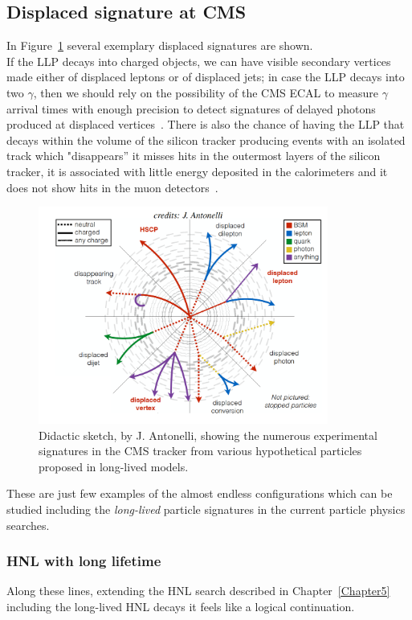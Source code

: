 \subsection{Displaced signature at CMS}
In Figure~\ref{fig:c6antonelli} several exemplary displaced
signatures are shown.\\
If the LLP decays into charged objects, we can have visible secondary vertices
made either of displaced leptons or of displaced jets; in case the LLP decays into two $\gamma$,
then we should rely on the possibility of the CMS
ECAL to measure $\gamma$ arrival times with enough precision to detect
signatures of delayed photons produced at displaced
vertices~\cite{Sirunyan:2019wau}.
There is also the chance of having the LLP that decays within the
volume of the silicon tracker producing events with an isolated track
which "disappears'' \ie it misses hits in the outermost layers of the
silicon tracker, it is associated with little energy deposited in the
calorimeters and it does not show hits in the muon detectors~\cite{Sirunyan_2020disapp}. 
\begin{figure}[h]
\centering
\includegraphics[clip,trim=0cm 0.cm 0.cm 1.6cm, width=0.85\textwidth]{Figures/c6/antonelli_skech.pdf}
\caption{Didactic sketch, by J. Antonelli, showing the numerous
  experimental signatures in the CMS tracker from various hypothetical particles proposed in long-lived models. }
\label{fig:c6antonelli}
\end{figure}

These are just few examples of the almost endless configurations which can
be studied including the \emph{long-lived} particle signatures in the
current particle physics searches. 

\subsubsection{HNL with long lifetime}
Along these lines, extending the HNL search described in
Chapter~\ref{Chapter5} including the long-lived HNL decays it feels like a logical
continuation. 

